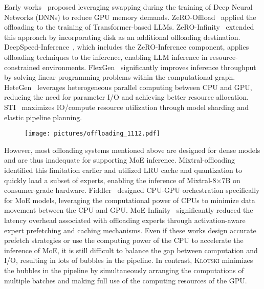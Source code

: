 Early works~\cite{huang2020swapadvisor, peng2020capuchin} proposed leveraging swapping during the training of Deep Neural Networks (DNNs) to reduce GPU memory demands. ZeRO-Offload~\cite{ren2021zero} applied the offloading to the training of Transformer-based LLMs. ZeRO-Infinity~\cite{rajbhandari2021zero} extended this approach by incorporating disk as an additional offloading destination. DeepSpeed-Inference~\cite{aminabadi2022deepspeed}, which includes the ZeRO-Inference component, applies offloading techniques to the inference, enabling LLM inference in resource-constrained environments. FlexGen~\cite{sheng2023flexgen} significantly improves inference throughput by solving linear programming problems within the computational graph. HeteGen~\cite{xuanlei2024hetegen} leverages heterogeneous parallel computing between CPU and GPU, reducing the need for parameter I/O and achieving better resource allocation. STI~\cite{guo2023sti} maximizes IO/compute resource utilization through model sharding and elastic pipeline planning. 

\begin{figure}[t]
  \centering
  \texttt{[image: pictures/offloading\_1112.pdf]}
  \caption{}
  \label{figure:offloading}
\end{figure}

However, most offloading systems mentioned above are designed for dense models and are thus inadequate for supporting MoE inference. Mixtral-offloading~\cite{eliseev2023fast} identified this limitation earlier and utilized LRU cache and quantization to quickly load a subset of experts, enabling the inference of Mixtral-8$\times$7B on consumer-grade hardware. Fiddler~\cite{kamahori2024fiddler} designed CPU-GPU orchestration specifically for MoE models, leveraging the computational power of CPUs to minimize data movement between the CPU and GPU. MoE-Infinity~\cite{xue2024moe} significantly reduced the latency overhead associated with offloading experts through activation-aware expert prefetching and caching mechanisms. Even if these works design accurate prefetch strategies or use the computing power of the CPU to accelerate the inference of MoE, it is still difficult to balance the gap between computation and I/O, resulting in lots of bubbles in the pipeline. In contrast, \textsc{Klotski} minimizes the bubbles in the pipeline by simultaneously arranging the computations of multiple batches and making full use of the computing resources of the GPU.